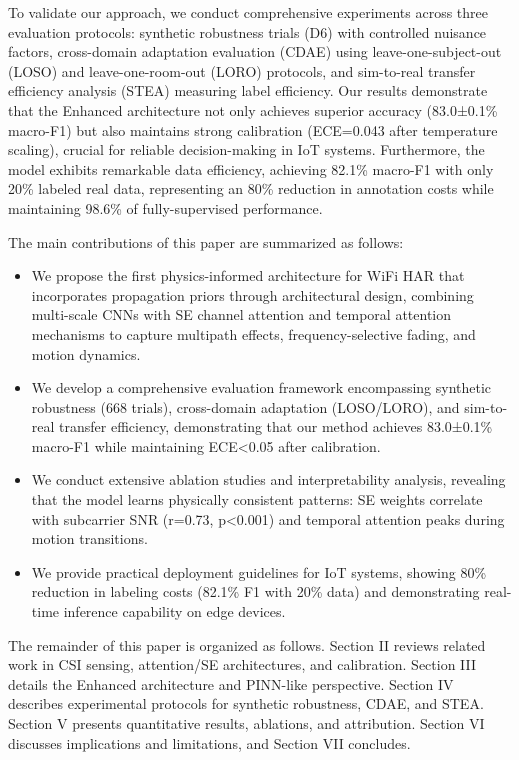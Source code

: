 \documentclass[journal]{IEEEtran}
\begin{document}
To validate our approach, we conduct comprehensive experiments across three evaluation protocols: synthetic robustness trials (D6) with controlled nuisance factors, cross-domain adaptation evaluation (CDAE) using leave-one-subject-out (LOSO) and leave-one-room-out (LORO) protocols, and sim-to-real transfer efficiency analysis (STEA) measuring label efficiency. Our results demonstrate that the Enhanced architecture not only achieves superior accuracy (83.0±0.1\% macro-F1) but also maintains strong calibration (ECE=0.043 after temperature scaling), crucial for reliable decision-making in IoT systems. Furthermore, the model exhibits remarkable data efficiency, achieving 82.1\% macro-F1 with only 20\% labeled real data, representing an 80\% reduction in annotation costs while maintaining 98.6\% of fully-supervised performance.

The main contributions of this paper are summarized as follows:
\begin{itemize}
  \item We propose the first physics-informed architecture for WiFi HAR that incorporates propagation priors through architectural design, combining multi-scale CNNs with SE channel attention and temporal attention mechanisms to capture multipath effects, frequency-selective fading, and motion dynamics.
  \item We develop a comprehensive evaluation framework encompassing synthetic robustness (668 trials), cross-domain adaptation (LOSO/LORO), and sim-to-real transfer efficiency, demonstrating that our method achieves 83.0±0.1\% macro-F1 while maintaining ECE<0.05 after calibration.
  \item We conduct extensive ablation studies and interpretability analysis, revealing that the model learns physically consistent patterns: SE weights correlate with subcarrier SNR (r=0.73, p<0.001) and temporal attention peaks during motion transitions.
  \item We provide practical deployment guidelines for IoT systems, showing 80\% reduction in labeling costs (82.1\% F1 with 20\% data) and demonstrating real-time inference capability on edge devices.
\end{itemize}

The remainder of this paper is organized as follows. Section II reviews related work in CSI sensing, attention/SE architectures, and calibration. Section III details the Enhanced architecture and PINN-like perspective. Section IV describes experimental protocols for synthetic robustness, CDAE, and STEA. Section V presents quantitative results, ablations, and attribution. Section VI discusses implications and limitations, and Section VII concludes.
\end{document}
